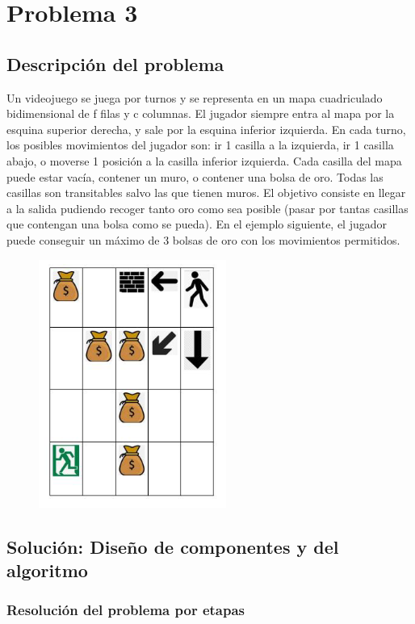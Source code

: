 \chapter{Problema 3}

\section{Descripción del problema}
Un videojuego se juega por turnos y se representa en un mapa cuadriculado bidimensional
de f filas y c columnas. El jugador siempre entra al mapa por la esquina superior derecha,
y sale por la esquina inferior izquierda. En cada turno, los posibles movimientos del
jugador son: ir 1 casilla a la izquierda, ir 1 casilla abajo, o moverse 1 posición a la casilla
inferior izquierda. Cada casilla del mapa puede estar vacía, contener un muro, o contener
una bolsa de oro. Todas las casillas son transitables salvo las que tienen muros. El objetivo
consiste en llegar a la salida pudiendo recoger tanto oro como sea posible (pasar por tantas
casillas que contengan una bolsa como se pueda). En el ejemplo siguiente, el jugador
puede conseguir un máximo de 3 bolsas de oro con los movimientos permitidos.

\begin{figure}[h]
    \centering
    \includegraphics[width=0.4\linewidth]{figures//problema3/imagen.png}
    \label{fig:enter-label}
\end{figure}

\section{Solución: Diseño de componentes y del algoritmo}


\subsection{Resolución del problema por etapas}

